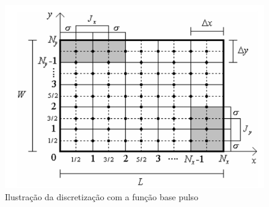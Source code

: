 \documentclass[
	12pt,				%
	openright,			%
	oneside,			%
	a4paper,			%
	english,			%
	brazil				%
	]{abntex2}
\begin{document}
\begin{apendicesenv}
\begin{figure}[htb]
    \centering
    \caption{Ilustração da discretização  com a função base pulso} \label{fig_minipage}
    \includegraphics[width=\textwidth]{figures/MalhaDiscretizacao.png}
  \hfill


\end{figure}
\end{apendicesenv}
\end{document}
